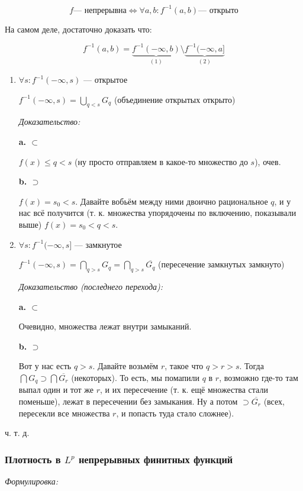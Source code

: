 \documentclass{article}
\begin{document}
\[f \text{--- непрерывна} \Leftrightarrow \forall a, b:  f^{-1}(a, b) \text{--- открыто}\]

На самом деле, достаточно доказать что: 

\[f^{-1}(a, b) = \underbrace{f^{-1}(-\infty, b)}_{(1)} \setminus \underbrace{f^{-1}(-\infty, a]}_{(2)}\]

\begin{enumerate}
    \item $\forall s: f^{-1}(-\infty, s)$ --- открытое
    
    $f^{-1}(-\infty, s) = \bigcup_{q < s} G_q$ (объединение открытых открыто)

    \textit{Доказательство:}
    
    \textbf{a. $\subset$}
    
    $f(x) \le q < s$ (ну просто отправляем в какое-то множество до $s$), очев.

    \textbf{b. $\supset$}

    $f(x) = s_0 < s$. Давайте вобьём между ними двоично рациональное $q$, и у нас всё получится (т. к. множества упорядочены по включению, показывали выше) $f(x) = s_0 < q < s$.

    \item $\forall s: f^{-1}(-\infty, s]$ --- замкнутое
    
    $f^{-1}(-\infty, s) = \bigcap_{q > s} G_q = \bigcap_{q > s} \overline{G_q}$ (пересечение замкнутых замкнуто)

    \textit{Доказательство (последнего перехода):}
    
    \textbf{a. $\subset$}
    
    Очевидно, множества лежат внутри замыканий.

    \textbf{b. $\supset$}

    Вот у нас есть $q > s$. Давайте возьмём $r$, такое что $q > r > s$. Тогда $\bigcap G_q \supset \bigcap \overline{G_r}$ (некоторых). То есть, мы помапили $q$ в $r$, возможно где-то там выпал один и тот же $r$, и их пересечение (т. к. ещё множества стали поменьше), лежат в пересечении без замыкания. Ну а потом $\supset \overline{G_r}$ (всех, пересекли все множества $r$, и попасть туда стало сложнее).
\end{enumerate}

ч. т. д. 

\subsubsection{Плотность в $L^p$ непрерывных финитных функций}
\textit{Формулировка:}
\end{document}
